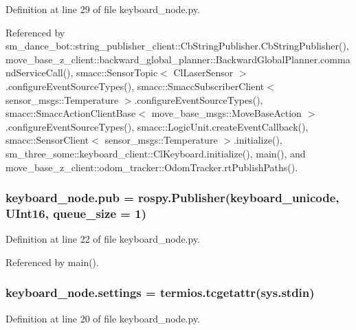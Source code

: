 Definition at line 29 of file keyboard\+\_\+node.\+py.



Referenced by sm\+\_\+dance\+\_\+bot\+::string\+\_\+publisher\+\_\+client\+::\+Cb\+String\+Publisher.\+Cb\+String\+Publisher(), move\+\_\+base\+\_\+z\+\_\+client\+::backward\+\_\+global\+\_\+planner\+::\+Backward\+Global\+Planner.\+command\+Service\+Call(), smacc\+::\+Sensor\+Topic$<$ Cl\+Laser\+Sensor $>$.\+configure\+Event\+Source\+Types(), smacc\+::\+Smacc\+Subscriber\+Client$<$ sensor\+\_\+msgs\+::\+Temperature $>$.\+configure\+Event\+Source\+Types(), smacc\+::\+Smacc\+Action\+Client\+Base$<$ move\+\_\+base\+\_\+msgs\+::\+Move\+Base\+Action $>$.\+configure\+Event\+Source\+Types(), smacc\+::\+Logic\+Unit.\+create\+Event\+Callback(), smacc\+::\+Sensor\+Client$<$ sensor\+\_\+msgs\+::\+Temperature $>$.\+initialize(), sm\+\_\+three\+\_\+some\+::keyboard\+\_\+client\+::\+Cl\+Keyboard.\+initialize(), main(), and move\+\_\+base\+\_\+z\+\_\+client\+::odom\+\_\+tracker\+::\+Odom\+Tracker.\+rt\+Publish\+Paths().

\subsubsection[{\texorpdfstring{pub}{pub}}]{\setlength{\rightskip}{0pt plus 5cm}keyboard\+\_\+node.\+pub = rospy.\+Publisher(\textquotesingle{}keyboard\+\_\+unicode\textquotesingle{}, U\+Int16, queue\+\_\+size = 1)}\hypertarget{namespacekeyboard__node_af6db75302d320b64f2d03f7b84404a9f}{}\label{namespacekeyboard__node_af6db75302d320b64f2d03f7b84404a9f}


Definition at line 22 of file keyboard\+\_\+node.\+py.



Referenced by main().

\subsubsection[{\texorpdfstring{settings}{settings}}]{\setlength{\rightskip}{0pt plus 5cm}keyboard\+\_\+node.\+settings = termios.\+tcgetattr(sys.\+stdin)}\hypertarget{namespacekeyboard__node_aaf29d185963f7dbed690d072de1a0b17}{}\label{namespacekeyboard__node_aaf29d185963f7dbed690d072de1a0b17}


Definition at line 20 of file keyboard\+\_\+node.\+py.

